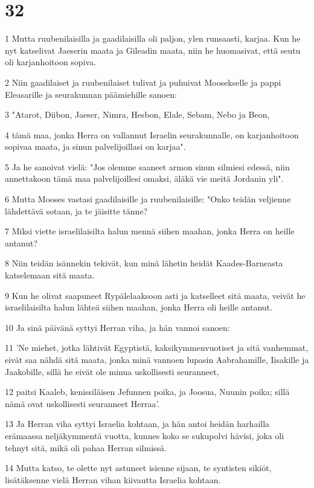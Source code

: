 \chapter{32}

\par 1 Mutta ruubenilaisilla ja gaadilaisilla oli paljon, ylen runsaasti, karjaa. Kun he nyt katselivat Jaeserin maata ja Gileadin maata, niin he huomasivat, että seutu oli karjanhoitoon sopiva.
\par 2 Niin gaadilaiset ja ruubenilaiset tulivat ja puhuivat Moosekselle ja pappi Eleasarille ja seurakunnan päämiehille sanoen:
\par 3 "Atarot, Diibon, Jaeser, Nimra, Hesbon, Elale, Sebam, Nebo ja Beon,
\par 4 tämä maa, jonka Herra on vallannut Israelin seurakunnalle, on karjanhoitoon sopivaa maata, ja sinun palvelijoillasi on karjaa".
\par 5 Ja he sanoivat vielä: "Jos olemme saaneet armon sinun silmiesi edessä, niin annettakoon tämä maa palvelijoillesi omaksi, äläkä vie meitä Jordanin yli".
\par 6 Mutta Mooses vastasi gaadilaisille ja ruubenilaisille: "Onko teidän veljienne lähdettävä sotaan, ja te jäisitte tänne?
\par 7 Miksi viette israelilaisilta halun mennä siihen maahan, jonka Herra on heille antanut?
\par 8 Niin teidän isännekin tekivät, kun minä lähetin heidät Kaades-Barneasta katselemaan sitä maata.
\par 9 Kun he olivat saapuneet Rypälelaaksoon asti ja katselleet sitä maata, veivät he israelilaisilta halun lähteä siihen maahan, jonka Herra oli heille antanut.
\par 10 Ja sinä päivänä syttyi Herran viha, ja hän vannoi sanoen:
\par 11 'Ne miehet, jotka lähtivät Egyptistä, kaksikymmenvuotiset ja sitä vanhemmat, eivät saa nähdä sitä maata, jonka minä vannoen lupasin Aabrahamille, Iisakille ja Jaakobille, sillä he eivät ole minua uskollisesti seuranneet,
\par 12 paitsi Kaaleb, kenissiläisen Jefunnen poika, ja Joosua, Nuunin poika; sillä nämä ovat uskollisesti seuranneet Herraa'.
\par 13 Ja Herran viha syttyi Israelia kohtaan, ja hän antoi heidän harhailla erämaassa neljäkymmentä vuotta, kunnes koko se sukupolvi hävisi, joka oli tehnyt sitä, mikä oli pahaa Herran silmissä.
\par 14 Mutta katso, te olette nyt astuneet isienne sijaan, te syntisten sikiöt, lisätäksenne vielä Herran vihan kiivautta Israelia kohtaan.
